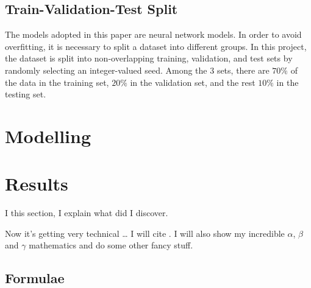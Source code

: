 \documentclass[11pt,twoside]{article}
\numberwithin{Theorem}{section}
\numberwithin{Definition}{section}
\numberwithin{Lemma}{section}
\numberwithin{Algorithm}{section}
\numberwithin{equation}{section}
\begin{document}
\subsection{Train-Validation-Test Split}
The models adopted in this paper are neural network models. In order to avoid overfitting, it is necessary to split a dataset into different groups. In this project, the dataset is split into non-overlapping training, validation, and test sets by randomly selecting an integer-valued seed. Among the $3$ sets, there are $70\%$ of the data in the training set, $20\%$ in the validation set, and the rest $10\%$ in the testing set.

\section{Modelling}


\section{Results}
\label{sec:results}
I this section, I explain what did I discover.

Now it's getting very technical \ldots{} I will cite \cite{shiina,groewe2001}. I will also show my incredible $\alpha$, $\beta$ and $\gamma$ mathematics and do some other fancy stuff.

\subsection{Formulae}
\end{document}
